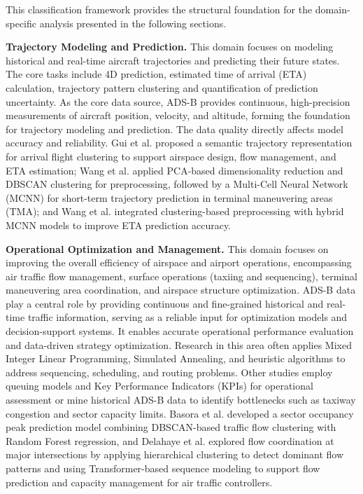 This classification framework provides the structural foundation for the domain-specific analysis presented in the following sections.


\textbf{Trajectory Modeling and Prediction.} 
This domain focuses on modeling historical and real-time aircraft trajectories and predicting their future states. The core tasks include 4D prediction, estimated time of arrival (ETA) calculation, trajectory pattern clustering and quantification of prediction uncertainty. As the core data source, ADS-B provides continuous, high-precision measurements of aircraft position, velocity, and altitude, forming the foundation for trajectory modeling and prediction. The data quality directly affects model accuracy and reliability. Gui et al. \cite{xuhao2021trajectory} proposed a semantic trajectory representation for arrival flight clustering to support airspace design, flow management, and ETA estimation; Wang et al. \cite{wang2017short} applied PCA-based dimensionality reduction and DBSCAN clustering for preprocessing, followed by a Multi-Cell Neural Network (MCNN) for short-term trajectory prediction in terminal maneuvering areas (TMA); and Wang et al. \cite{wang2018hybrid} integrated clustering-based preprocessing with hybrid MCNN models to improve ETA prediction accuracy.

\textbf{Operational Optimization and Management.} 
This domain focuses on improving the overall efficiency of airspace and airport operations, encompassing air traffic flow management, surface operations (taxiing and sequencing), terminal maneuvering area coordination, and airspace structure optimization. ADS-B data play a central role by providing continuous and fine-grained historical and real-time traffic information, serving as a reliable input for optimization models and decision-support systems. It enables accurate operational performance evaluation and data-driven strategy optimization. Research in this area often applies Mixed Integer Linear Programming, Simulated Annealing, and heuristic algorithms to address sequencing, scheduling, and routing problems. Other studies employ queuing models and Key Performance Indicators (KPIs) for operational assessment or mine historical ADS-B data to identify bottlenecks such as taxiway congestion and sector capacity limits. Basora et al. \cite{basora2018occupancy} developed a sector occupancy peak prediction model combining DBSCAN-based traffic flow clustering with Random Forest regression, and Delahaye et al. \cite{delahaye2022air} explored flow coordination at major intersections by applying hierarchical clustering to detect dominant flow patterns and using Transformer-based sequence modeling to support flow prediction and capacity management for air traffic controllers.


